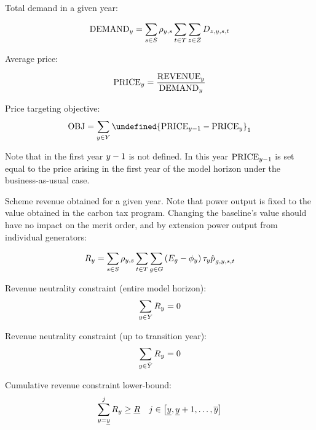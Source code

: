 \documentclass{article}
\let\norm\undefined %
\DeclarePairedDelimiter\norm{\lVert}{\rVert}
\begin{document}
Total demand in a given year:

\begin{equation}
\mathrm{DEMAND}_{\iYear} = \sum\limits_{\iScenario \in \sScenarios} \cScenarioDuration \sum\limits_{\iInterval \in \sIntervals}\sum\limits_{\iZone \in \sZones} \cDemand
\end{equation}

Average price:

\begin{equation}
\mathrm{PRICE}_{\iYear} = \frac{\mathrm{REVENUE}_{\iYear}}{\mathrm{DEMAND}_{\iYear}}
\end{equation}

Price targeting objective:
\begin{equation}
\mathrm{OBJ} = \sum\limits_{\iYear \in \sYears} \norm{\mathrm{PRICE}_{\iYear-1} - \mathrm{PRICE}_{\iYear}}_{1}
\end{equation}

Note that in the first year $\iYear - 1$ is not defined. In this year $\mathrm{PRICE}_{\iYear-1}$ is set equal to the price arising in the first year of the model horizon under the business-as-usual case.

Scheme revenue obtained for a given year. Note that power output is fixed to the value obtained in the carbon tax program. Changing the baseline's value should have no impact on the merit order, and by extension power output from individual generators:

\begin{equation}
R_{\iYear} = \sum\limits_{\iScenario \in \sScenarios} \cScenarioDuration \sum\limits_{\iInterval \in \sIntervals} \sum\limits_{\iGenerator \in \sGenerators} \left(\cEmissionsIntensity - \vBaseline \right) \vPermitPrice \hat{\vPower[]}_{\iGenerator,\iYear,\iScenario,\iInterval}
\end{equation}

Revenue neutrality constraint (entire model horizon):
\begin{equation}
\sum\limits_{\iYear \in \sYears} R_{\iYear} = 0
\end{equation}

Revenue neutrality constraint (up to transition year):
\begin{equation}
\sum\limits_{\iYear \in \bar{\sYears}} R_{\iYear} = 0
\end{equation}

Cumulative revenue constraint lower-bound:
\begin{equation}
\sum\limits_{\iYear=\iYearStart}^{\iYearAlias} R_{\iYear} \geq \underline{R} \quad  \iYearAlias \in \left[\iYearStart, \iYearStart + 1, \ldots, \iYearTerminal \right] 
\end{equation}
\end{document}
